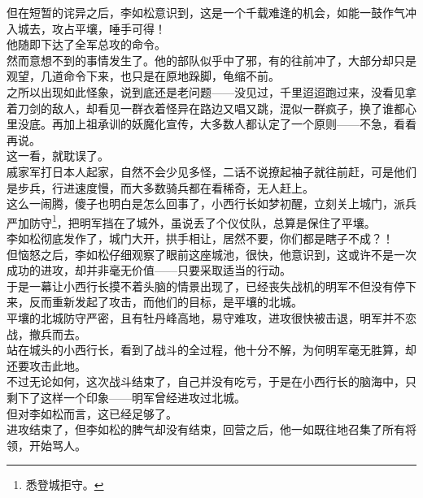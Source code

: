 \begin{multicols}{\theparacolNo}
但在短暂的诧异之后，李如松意识到，这是一个千载难逢的机会，如能一鼓作气冲入城去，攻占平壤，唾手可得！\\

他随即下达了全军总攻的命令。\\

然而意想不到的事情发生了。他的部队似乎中了邪，有的往前冲了，大部分却只是观望，几道命令下来，也只是在原地跺脚，龟缩不前。\\

之所以出现如此怪象，说到底还是老问题——没见过，千里迢迢跑过来，没看见拿着刀剑的敌人，却看见一群衣着怪异在路边又唱又跳，混似一群疯子，换了谁都心里没底。再加上祖承训的妖魔化宣传，大多数人都认定了一个原则——不急，看看再说。\\

这一看，就耽误了。\\

戚家军打日本人起家，自然不会少见多怪，二话不说撩起袖子就往前赶，可是他们是步兵，行进速度慢，而大多数骑兵都在看稀奇，无人赶上。\\

这么一闹腾，傻子也明白是怎么回事了，小西行长如梦初醒，立刻关上城门，派兵严加防守\footnote{悉登城拒守。}，把明军挡在了城外，虽说丢了个仪仗队，总算是保住了平壤。\\

李如松彻底发作了，城门大开，拱手相让，居然不要，你们都是瞎子不成？！\\

但恼怒之后，李如松仔细观察了眼前这座城池，很快，他意识到，这或许不是一次成功的进攻，却并非毫无价值——只要采取适当的行动。\\

于是一幕让小西行长摸不着头脑的情景出现了，已经丧失战机的明军不但没有停下来，反而重新发起了攻击，而他们的目标，是平壤的北城。\\

平壤的北城防守严密，且有牡丹峰高地，易守难攻，进攻很快被击退，明军并不恋战，撤兵而去。\\

站在城头的小西行长，看到了战斗的全过程，他十分不解，为何明军毫无胜算，却还要攻击此地。\\

不过无论如何，这次战斗结束了，自己并没有吃亏，于是在小西行长的脑海中，只剩下了这样一个印象——明军曾经进攻过北城。\\

但对李如松而言，这已经足够了。\\

进攻结束了，但李如松的脾气却没有结束，回营之后，他一如既往地召集了所有将领，开始骂人。\\


\end{multicols}
